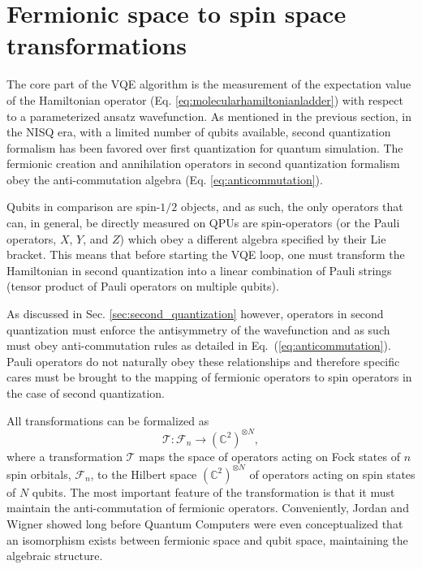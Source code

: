 \section{Fermionic space to spin space transformations}\label{sec:Encoding}

The core part of the VQE algorithm is the measurement of the expectation value of the Hamiltonian operator (Eq. \ref{eq:molecularhamiltonianladder}) with respect to a parameterized ansatz wavefunction.  As mentioned in the previous section, in the NISQ era, with a limited number of qubits available, second quantization formalism has been favored over first quantization for quantum simulation. The fermionic creation and annihilation operators in second quantization formalism obey the anti-commutation algebra (Eq. \ref{eq:anticommutation}).

Qubits in comparison are spin-$1/2$ objects, and as such, the only operators that can, in general, be directly measured on QPUs are spin-operators (or the Pauli operators, $X$, $Y$, and $Z$) which obey a different algebra specified by their Lie bracket. This means that before starting the VQE loop, one must transform the Hamiltonian in second quantization into a linear combination of Pauli strings (tensor product of Pauli operators on multiple qubits). 

As discussed in Sec. \ref{sec:second_quantization} however, operators in second quantization must enforce the antisymmetry of the wavefunction and as such must obey anti-commutation rules as detailed in Eq.~(\ref{eq:anticommutation}). Pauli operators do not naturally obey these relationships and therefore specific cares must be brought to the mapping of fermionic operators to spin operators in the case of second quantization. 

All transformations can be formalized as 
\begin{equation}
    \mathcal{T}: \mathcal{F}_n \rightarrow (\mathbb{C}^2)^{\otimes N},
\end{equation}
where a transformation $\mathcal{T}$ maps the space of operators acting on Fock states of $n$ spin orbitals, $\mathcal{F}_n$, to the Hilbert space $(\mathbb{C}^2)^{\otimes N}$ of operators acting on spin states of $N$ qubits. The most important feature of the transformation is that it must maintain the anti-commutation of fermionic operators. Conveniently, Jordan and Wigner \cite{Jordan1928} showed long before Quantum Computers were even conceptualized that an isomorphism exists between fermionic space and qubit space, maintaining the algebraic structure. 

